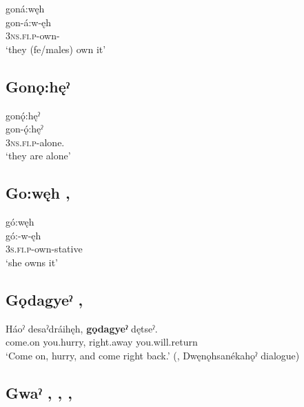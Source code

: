 \ea
\label{ex:gpar86}
\glll goná:węh\\
gon-á:w-ęh\\
\textsc{3ns.fi.p}-own-\stative\\
\glt ‘they (fe/males) own it’
\z


\subsection*{\textbf{Gonǫ:hęˀ} } \label{p:[gonǫ:hęˀ]}

\ea\label{ex:gpar84}
gonǫ́:hęˀ\\
\gll gon-ǫ́:hęˀ\\
\textsc{3ns.fi.p}-alone.\stative\\
\glt ‘they are alone’
\z



\subsection*{\textbf{Go:węh} , } \label{p:[go:węh]}

\ea\label{ex:gpar85} 
gó:węh\\
\gll gó:-w-ęh\\
\textsc{3s.fi.p}-own-stative\\
\glt ‘she owns it’
\z


\subsection*{\textbf{Gǫdagyeˀ} , } \label{p:[gǫdagyeˀ]}

\ea
\label{ex:gpar87}
\gll Háoˀ desaˀdráihęh, \textbf{gǫdagyeˀ} dętseˀ.\\
come.on you.hurry, right.away you.will.return\\
\glt ‘Come on, hurry, and come right back.’ (\cite[441]{mithun_watewayestanih_1984}, Dwęnǫhsanékahǫˀ dialogue)
\z


\subsection*{\textbf{Gwaˀ} , , , } \label{p:[gwaˀ] ‘immediately’}

